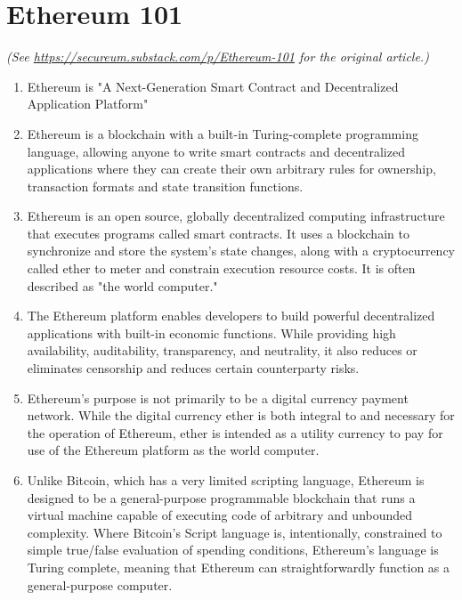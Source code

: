 \section{Ethereum 101}

\textit{(See \url{https://secureum.substack.com/p/Ethereum-101} for the original article.)}\\

\begin{enumerate}

\item Ethereum is "A Next-Generation Smart Contract and Decentralized Application Platform"

\item Ethereum is a blockchain with a built-in Turing-complete programming language, allowing anyone to write smart contracts and decentralized applications where they can create their own arbitrary rules for ownership, transaction formats and state transition functions.

\item Ethereum is an open source, globally decentralized computing infrastructure that executes programs called smart contracts. It uses a blockchain to synchronize and store the system's state changes, along with a cryptocurrency called ether to meter and constrain execution resource costs. It is often described as "the world computer."

\item The Ethereum platform enables developers to build powerful decentralized applications with built-in economic functions. While providing high availability, auditability, transparency, and neutrality, it also reduces or eliminates censorship and reduces certain counterparty risks.

\item Ethereum's purpose is not primarily to be a digital currency payment network. While the digital currency ether is both integral to and necessary for the operation of Ethereum, ether is intended as a utility currency to pay for use of the Ethereum platform as the world computer.

\item Unlike Bitcoin, which has a very limited scripting language, Ethereum is designed to be a general-purpose programmable blockchain that runs a virtual machine capable of executing code of arbitrary and unbounded complexity. Where Bitcoin's Script language is, intentionally, constrained to simple true/false evaluation of spending conditions, Ethereum's language is Turing complete, meaning that Ethereum can straightforwardly function as a general-purpose computer.


\end{enumerate}
